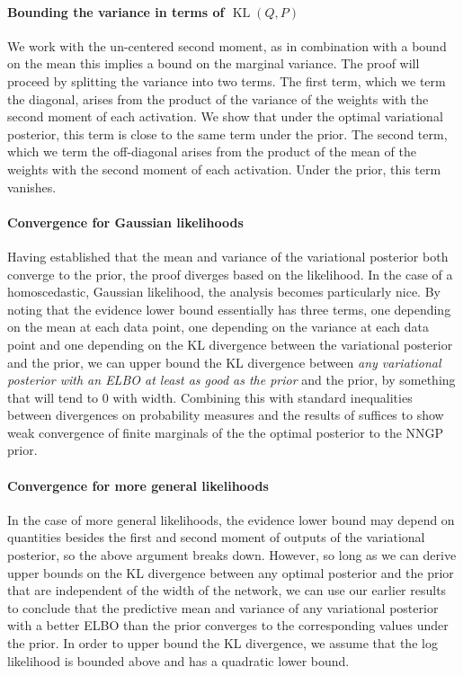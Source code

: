 \documentclass[twoside]{article}
\renewcommand{\P}{\mathbb{P}}
\newcommand{\Q}{\mathbb{Q}}
\renewcommand{\Q}{\ensuremath{Q}}
\renewcommand{\P}{\ensuremath{P}}
\newcommand{\KL}{\operatorname{KL}}
\theoremstyle{theoremstyle}
\begin{document}
\paragraph{Bounding the variance in terms of $\KL(\Q,\P)$}
We work with the un-centered second moment, as in combination with a bound on the mean this implies a bound on the marginal variance.  The proof will proceed by splitting the variance into two terms.  The first term, which we term the diagonal, arises from the product of the variance of the weights with the second moment of each activation.  We show that under the optimal variational posterior, this term is close to the same term under the prior. The second term, which we term the off-diagonal arises from the product of the mean of the weights with the second moment of each activation. Under the prior, this term vanishes.

\paragraph{Convergence for Gaussian likelihoods}
Having established that the mean and variance of the variational posterior both converge to the prior, the proof diverges based on the likelihood. In the case of a homoscedastic, Gaussian likelihood, the analysis becomes particularly nice. By noting that the evidence lower bound essentially has three terms, one depending on the mean at each data point, one depending on the variance at each data point and one depending on the KL divergence between the variational posterior and the prior, we can upper bound the KL divergence between \emph{any variational posterior with an ELBO at least as good as the prior} and the prior, by something that will tend to $0$ with width. Combining this with standard inequalities between divergences on probability measures and the results of \citet{matthews_2018} suffices to show weak convergence of finite marginals of the the optimal posterior to the NNGP prior.  %

\paragraph{Convergence for more general likelihoods}
In the case of more general likelihoods, the evidence lower bound may depend on quantities besides the first and second moment of outputs of the variational posterior, so the above argument breaks down. However, so long as we can derive upper bounds on the KL divergence between any optimal posterior and the prior that are independent of the width of the network, we can use our earlier results to conclude that the predictive mean and variance of any variational posterior with a better ELBO than the prior converges to the corresponding values under the prior. In order to upper bound the KL divergence, we assume that the log likelihood is bounded above and has a quadratic lower bound.
\end{document}
